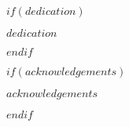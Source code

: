 \documentclass[phdthesis,12pt,final]{wuthesis}
\begin{document}









\begin{thesistitlepage}
\end{thesistitlepage}
\setcounter{page}{2}

\begin{thesiscopyrightpage}
\end{thesiscopyrightpage}

\cleardoublepage

\vspace*{\fill}

\noindent\thesiscommittee

\vspace*{10cm} %


$if(dedication)$
\cleardoublepage
\begin{thesisdedicationpage}
$dedication$
\end{thesisdedicationpage}
$endif$

$if(acknowledgements)$
\cleardoublepage
\begin{thesisacknowledgments}
$acknowledgements$
\end{thesisacknowledgments}
$endif$
\end{document}
